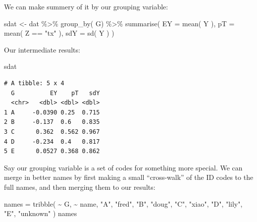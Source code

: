 \documentclass[
  letterpaper,
  DIV=11,
  numbers=noendperiod]{scrreprt}
\newenvironment{Shaded}{\begin{snugshade}}{\end{snugshade}}
\newcommand{\AttributeTok}[1]{\textcolor[rgb]{0.49,0.56,0.16}{#1}}
\newcommand{\FunctionTok}[1]{\textcolor[rgb]{0.02,0.16,0.49}{#1}}
\newcommand{\NormalTok}[1]{\textcolor[rgb]{0.00,0.44,0.13}{#1}}
\newcommand{\OtherTok}[1]{\textcolor[rgb]{0.00,0.44,0.13}{#1}}
\newcommand{\SpecialCharTok}[1]{\textcolor[rgb]{0.25,0.44,0.63}{#1}}
\newcommand{\StringTok}[1]{\textcolor[rgb]{0.25,0.44,0.63}{#1}}
\begin{document}
We can make summery of it by our grouping variable:

\begin{Shaded}
\begin{Highlighting}[]
\NormalTok{sdat }\OtherTok{\textless{}{-}}\NormalTok{ dat }\SpecialCharTok{\%\textgreater{}\%} \FunctionTok{group\_by}\NormalTok{( G) }\SpecialCharTok{\%\textgreater{}\%}
    \FunctionTok{summarise}\NormalTok{( }\AttributeTok{EY =} \FunctionTok{mean}\NormalTok{( Y ),}
               \AttributeTok{pT =} \FunctionTok{mean}\NormalTok{( Z }\SpecialCharTok{==} \StringTok{"tx"}\NormalTok{ ),}
               \AttributeTok{sdY =} \FunctionTok{sd}\NormalTok{( Y ) )}
\end{Highlighting}
\end{Shaded}

Our intermediate results:

\begin{Shaded}
\begin{Highlighting}[]
\NormalTok{sdat}
\end{Highlighting}
\end{Shaded}

\begin{verbatim}
# A tibble: 5 x 4
  G          EY    pT   sdY
  <chr>   <dbl> <dbl> <dbl>
1 A     -0.0390 0.25  0.715
2 B     -0.137  0.6   0.835
3 C      0.362  0.562 0.967
4 D     -0.234  0.4   0.817
5 E      0.0527 0.368 0.862
\end{verbatim}

Say our grouping variable is a set of codes for something more special.
We can merge in better names by first making a small ``cross-walk'' of
the ID codes to the full names, and then merging them to our results:

\begin{Shaded}
\begin{Highlighting}[]
\NormalTok{names }\OtherTok{=} \FunctionTok{tribble}\NormalTok{( }\SpecialCharTok{\textasciitilde{}}\NormalTok{ G, }\SpecialCharTok{\textasciitilde{}}\NormalTok{ name,}
                 \StringTok{"A"}\NormalTok{, }\StringTok{"fred"}\NormalTok{,}
                 \StringTok{"B"}\NormalTok{, }\StringTok{"doug"}\NormalTok{,}
                 \StringTok{"C"}\NormalTok{, }\StringTok{"xiao"}\NormalTok{,}
                 \StringTok{"D"}\NormalTok{, }\StringTok{"lily"}\NormalTok{,}
                 \StringTok{"E"}\NormalTok{, }\StringTok{"unknown"}\NormalTok{ )}
\NormalTok{names}
\end{Highlighting}
\end{Shaded}
\end{document}
